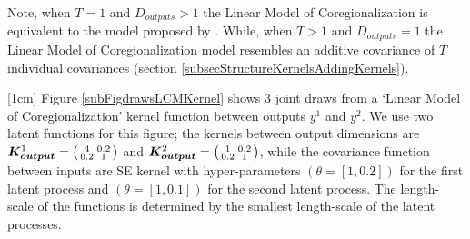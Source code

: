 Note, when $T = 1$ and $D_{outputs} > 1$ the Linear Model of Coregionalization is equivalent to the model proposed by \cite{bonilla2007multi}. While, when $T > 1$ and $D_{outputs} = 1$ the Linear Model of Coregionalization model resembles an additive covariance of $T$ individual covariances (section \ref{subsecStructureKernelsAddingKernels}).

[1cm]
Figure \ref{subFigdrawsLCMKernel} shows 3 joint draws from a `Linear Model of Coregionalization' kernel function between outputs $y^{1}$ and $y^{2}$. We use two latent functions for this figure; the kernels between output dimensions are $\boldsymbol{K_{output}}^{1} = \bigl( \begin{smallmatrix} 4 & 0.2\\ 0.2 & 1\end{smallmatrix}\bigr)$ and $\boldsymbol{K_{output}}^{2} = \bigl( \begin{smallmatrix} 1 & 0.2\\ 0.2 & 1\end{smallmatrix}\bigr)$, while the covariance function between inputs are SE kernel with hyper-parameters $(\theta = [1, 0.2])$ for the first latent process and $(\theta = [1, 0.1])$ for the second latent process. The length-scale of the functions is determined by the smallest length-scale of the latent processes.

